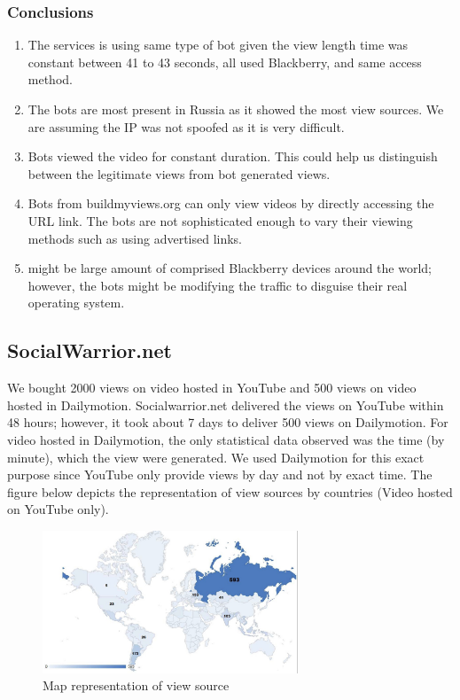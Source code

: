 \documentclass[conference]{IEEEtran}
\begin{document}
\subsubsection*{Conclusions}

\begin{enumerate}
  \item The services is using same type of bot given the view length time was constant between 41 to 43 seconds, all used Blackberry, and same access method.
  \item The bots are most present in Russia as it showed the most view sources. We are assuming the IP was not spoofed as it is very difficult.
  \item Bots viewed the video for constant duration. This could help us distinguish between the legitimate views from bot generated views.
  \item Bots from buildmyviews.org can only view videos by directly accessing the URL link. The bots are not sophisticated enough to vary their viewing methods such as using advertised links.
  \item might be large amount of comprised Blackberry devices around the world; however, the bots might be modifying the traffic to disguise their real operating system.
\end{enumerate}

\subsection{SocialWarrior.net}

We bought 2000 views on video hosted in YouTube and 500 views on video hosted in Dailymotion. Socialwarrior.net delivered the views on YouTube within 48 hours; however, it took about 7 days to deliver 500 views on Dailymotion. For video hosted in Dailymotion, the only statistical data observed was the time (by minute), which the view were generated. We used Dailymotion for this exact purpose since YouTube only provide views by day and not by exact time. The figure below depicts the representation of view sources by countries (Video hosted on YouTube only).

\begin{figure}
  \centering
  \includegraphics[width=3.0in]{fig6a}
  \caption{Map representation of view source}
\end{figure}
\end{document}
